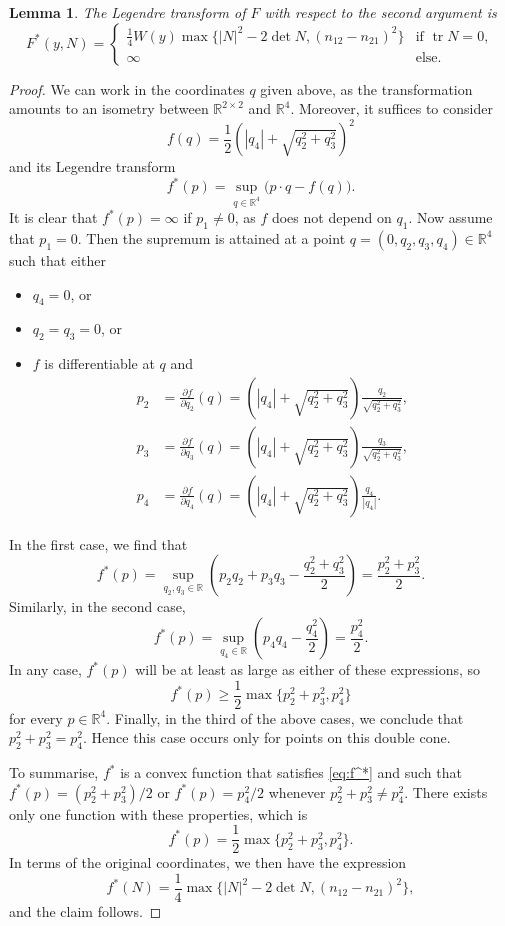 \documentclass[a4paper]{article}
\newcommand{\R}{\mathbb{R}}
\DeclareMathOperator{\tr}{tr}
\newcommand{\dd}[2]{\frac{\partial #1}{\partial #2}}
\newtheorem{lemma}[theorem]{Lemma}
\theoremstyle{definition}
\theoremstyle{remark}
\begin{document}
\begin{lemma}
The Legendre transform of $F$ with respect to the second argument is
\[
F^*(y, N) = \begin{cases}
\frac{1}{4} W(y) \max\{|N|^2 - 2 \det N, (n_{12} - n_{21})^2\} & \text{if $\tr N = 0$}, \\
\infty & \text{else}.
\end{cases}
\]
\end{lemma}

\begin{proof}
We can work in the coordinates $q$ given above, as the transformation amounts
to an isometry between $\R^{2 \times 2}$ and $\R^4$. Moreover, it suffices
to consider
\[
f(q) = \frac{1}{2}\left(|q_4| + \sqrt{q_2^2 + q_3^2}\right)^2
\]
and its Legendre transform
\[
f^*(p) = \sup_{q \in \R^4} \bigl(p \cdot q - f(q)\bigr).
\]
It is clear that $f^*(p) = \infty$ if $p_1 \neq 0$, as $f$ does not depend
on $q_1$. Now assume that $p_1 = 0$. Then the supremum is attained at a point
$q = (0, q_2, q_3, q_4) \in \R^4$ such that either
\begin{itemize}
\item $q_4 = 0$, or
\item $q_2 = q_3 = 0$, or
\item $f$ is differentiable at $q$ and
\begin{align*}
p_2 & = \dd{f}{q_2}(q) = \left(|q_4| + \sqrt{q_2^2 + q_3^2}\right) \frac{q_2}{\sqrt{q_2^2 + q_3^2}}, \\
p_3 & = \dd{f}{q_3}(q) = \left(|q_4| + \sqrt{q_2^2 + q_3^2}\right) \frac{q_3}{\sqrt{q_2^2 + q_3^2}}, \\
p_4 & = \dd{f}{q_4}(q) = \left(|q_4| + \sqrt{q_2^2 + q_3^2}\right) \frac{q_4}{|q_4|}.
\end{align*}
\end{itemize}

In the first case, we find that
\[
f^*(p) = \sup_{q_2, q_3 \in \R} \left(p_2 q_2 + p_3 q_3 - \frac{q_2^2 + q_3^2}{2}\right) = \frac{p_2^2 + p_3^2}{2}.
\]
Similarly, in the second case,
\[
f^*(p) = \sup_{q_4 \in \R} \left(p_4 q_4 - \frac{q_4^2}{2}\right) = \frac{p_4^2}{2}.
\]
In any case, $f^*(p)$ will be at least as large as either of these expressions,
so
\begin{equation} \label{eq:f^*}
f^*(p) \ge \frac{1}{2} \max\{p_2^2 + p_3^2, p_4^2\}
\end{equation}
for every $p \in \R^4$. Finally, in the third of the above cases, we conclude
that $p_2^2 + p_3^2 = p_4^2$. Hence this case occurs only for points on this
double cone.

To summarise, $f^*$ is a convex function that satisfies \eqref{eq:f^*} and
such that $f^*(p) = (p_2^2 + p_3^2)/2$ or $f^*(p) = p_4^2/2$
whenever $p_2^2 + p_3^2 \neq p_4^2$. There exists only one function with
these properties, which is
\[
f^*(p) = \frac{1}{2} \max\{p_2^2 + p_3^2, p_4^2\}.
\]
In terms of the original coordinates, we then have the expression
\[
f^*(N) = \frac{1}{4} \max\{|N|^2 - 2 \det N, (n_{12} - n_{21})^2\},
\]
and the claim follows.
\end{proof}
\end{document}
